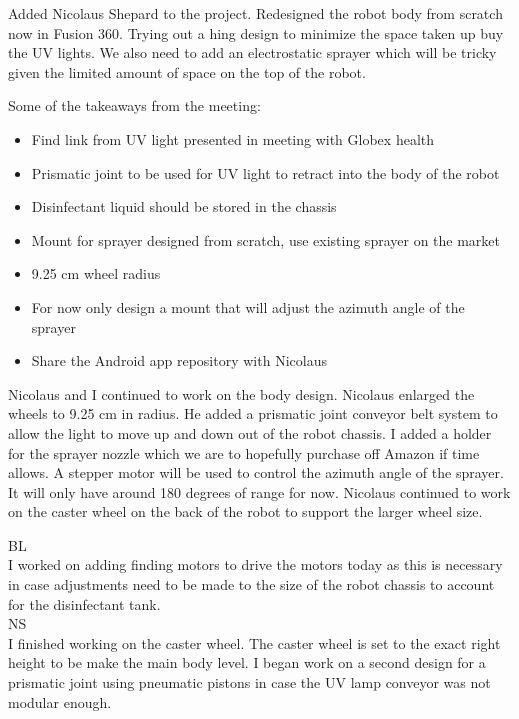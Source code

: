 \documentclass[fontsize=11pt, %
                             paper=a4, %
                             twoside, %
                             captions=tableheading,
                             index=totoc,
                             hyperref]{labbook}
\begin{document}
\begin{addmargin}[0cm]{0cm}
Added Nicolaus Shepard to the project. Redesigned the robot body from scratch now in Fusion 360. Trying out a hing design to minimize the space taken up buy the UV lights. We also need to add an electrostatic sprayer which will be tricky given the limited amount of space on the top of the robot.

Some of the takeaways from the meeting:
\begin{itemize}
\item Find link from UV light presented in meeting with Globex health
\item Prismatic joint to be used for UV light to retract into the body of the robot
\item Disinfectant liquid should be stored in the chassis
\item Mount for sprayer designed from scratch, use existing sprayer on the market
\item 9.25 cm wheel radius
\item For now only design a mount that will adjust the azimuth angle of the sprayer
\item Share the Android app repository with Nicolaus
\end{itemize}
Nicolaus and I continued to work on the body design. Nicolaus enlarged the wheels to 9.25 cm in radius. He added a prismatic joint conveyor belt system to allow the light to move up and down out of the robot chassis. I added a holder for the sprayer nozzle which we are to hopefully purchase off Amazon if time allows. A stepper motor will be used to control the azimuth angle of the sprayer. It will only have around 180 degrees of range for now. Nicolaus continued to work on the caster wheel on the back of the robot to support the larger wheel size.

BL\\
I worked on adding finding motors to drive the motors today as this is necessary in case adjustments need to be made to the size of the robot chassis to account for the disinfectant tank.\\
NS\\
I finished working on the caster wheel. The caster wheel is set to the exact right height to be make the main body level. I began work on a second design for a prismatic joint using pneumatic pistons in case the UV lamp conveyor was not modular enough.


\end{addmargin}
\end{document}
